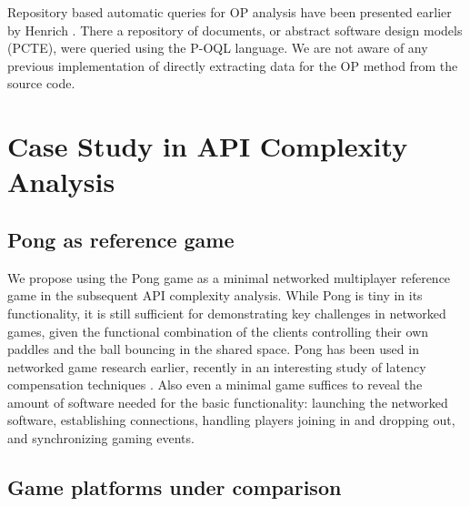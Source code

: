 \documentclass[conference]{IEEEtran}
\begin{document}
Repository based automatic queries for OP analysis have been presented
earlier by Henrich \cite{henrich97repositorybased}. There a repository of
documents, or abstract software design models (PCTE), were queried
using the P-OQL language. We are not aware of any previous
implementation of directly extracting data for the OP method from the
source code.


\section{Case Study in API Complexity Analysis%
  \label{case-study-in-api-complexity-analysis}%
}


\subsection{Pong as reference game%
  \label{pong-as-reference-game}%
}

We propose using the Pong game as a minimal networked multiplayer
reference game in the subsequent API complexity analysis. While Pong
is tiny in its functionality, it is still sufficient for demonstrating
key challenges in networked games, given the functional combination of
the clients controlling their own paddles and the ball bouncing in the
shared space. Pong has been used in networked game research earlier,
recently in an interesting study of latency compensation techniques
\cite{pong-ping}. Also even a minimal game suffices to reveal the amount of
software needed for the basic functionality: launching the networked
software, establishing connections, handling players joining in and
dropping out, and synchronizing gaming events.


\subsection{Game platforms under comparison%
  \label{game-platforms-under-comparison}%
}
\end{document}
